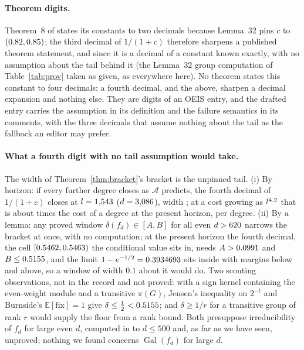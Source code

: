 \documentclass[11pt]{article}
\DeclareMathOperator{\Gal}{Gal}
\begin{document}
\paragraph{Theorem digits.} Theorem~8 of \cite{vD24} states its constants to two decimals because Lemma~32 pins $c$ to $(0.82,0.85)$; the third decimal of $1/(1+c)$ therefore sharpens a published theorem statement, and since \cite{vD26} it is a decimal of a constant known exactly, with no assumption about the tail behind it (the Lemma~32 group computation of Table~\ref{tab:prov} taken as given, as everywhere here). No theorem states this constant to four decimals: a fourth decimal, and the \CStarDigits{} above, sharpen a decimal expansion and nothing else. They are digits of an OEIS entry, and the drafted entry carries the assumption in its definition and the failure semantics in its comments, with the three decimals that assume nothing about the tail as the fallback an editor may prefer.

\paragraph{What a fourth digit with no tail assumption would take.} The width of Theorem~\ref{thm:bracket}'s bracket is the unpinned tail. (i) By horizon: if every further degree closes as $\mathcal A$ predicts, the fourth decimal of $1/(1+c)$ closes at $l=1{,}543$ ($d=3{,}086$), width \FourthWidth; at a cost growing as $l^{4.2}$ that is about \FourthCost{} times the cost of a degree at the present horizon, per degree. (ii) By a lemma: any proved window $\delta(f_d)\in[A,B]$ for all even $d>620$ narrows the bracket at once, with no computation; at the present horizon the fourth decimal, the cell $[0.5462,0.5463)$ the conditional value sits in, needs $A>0.0991$ and $B\le0.5155$, and the limit $1-e^{-1/2}=0.3934693$ sits inside with margins \WindowMarginLo{} below and \WindowMarginHi{} above, so a window of width $0.1$ about it would do. Two scouting observations, not in the record and not proved: with a sign kernel containing the even-weight module and a transitive $\pi(G)$, Jensen's inequality on $2^{-t}$ and Burnside's $\mathbb E[\mathrm{fix}]=1$ give $\delta\le\frac12<0.5155$; and $\delta\ge1/r$ for a transitive group of rank $r$ \cite{DFG} would supply the floor from a rank bound. Both presuppose irreducibility of $f_d$ for large even $d$, computed in \cite{vD24} to $d\le500$ and, as far as we have seen, unproved; nothing we found concerns $\Gal(f_d)$ for large $d$.
\end{document}
